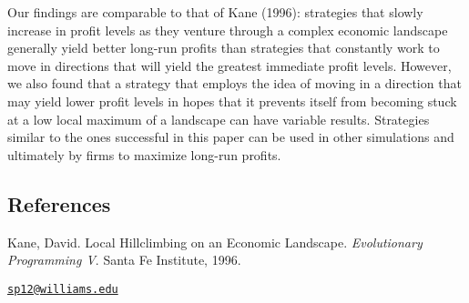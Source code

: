 Our findings are comparable to that of Kane (1996): strategies that
slowly increase in profit levels as they venture through a complex
economic landscape generally yield better long-run profits than
strategies that constantly work to move in directions that will yield
the greatest immediate profit levels. However, we also found that a
strategy that employs the idea of moving in a direction that may yield
lower profit levels in hopes that it prevents itself from becoming stuck
at a low local maximum of a landscape can have variable results.
Strategies similar to the ones successful in this paper can be used in
other simulations and ultimately by firms to maximize long-run profits.

\subsection{References}\label{references}

Kane, David. Local Hillclimbing on an Economic Landscape.
\emph{Evolutionary Programming V}. Santa Fe Institute, 1996.



\address{
Sohum Patnaik\\
\\
}
\href{mailto:sp12@williams.edu}{\nolinkurl{sp12@williams.edu}}

